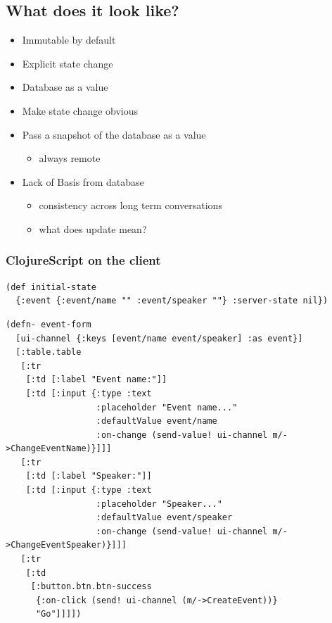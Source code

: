 \documentclass[11pt]{article}
\begin{document}
\subsection*{What does it look like?}
\label{sec:orgheadline22}

\begin{itemize}
\item Immutable by default
\item Explicit state change
\item Database as a value
\end{itemize}

\begin{NOTES}
\begin{itemize}
\item Make state change obvious
\item Pass a snapshot of the database as a value
\begin{itemize}
\item always remote
\end{itemize}
\item Lack of Basis from database
\begin{itemize}
\item consistency across long term conversations
\item what does update mean?
\end{itemize}
\end{itemize}
\end{NOTES}

\subsubsection*{ClojureScript on the client}
\label{sec:orgheadline20}

\begin{verbatim}
(def initial-state
  {:event {:event/name "" :event/speaker ""} :server-state nil})
\end{verbatim}
\begin{verbatim}
(defn- event-form
  [ui-channel {:keys [event/name event/speaker] :as event}]
  [:table.table
   [:tr
    [:td [:label "Event name:"]]
    [:td [:input {:type :text
                  :placeholder "Event name..."
                  :defaultValue event/name
                  :on-change (send-value! ui-channel m/->ChangeEventName)}]]]
   [:tr
    [:td [:label "Speaker:"]]
    [:td [:input {:type :text
                  :placeholder "Speaker..."
                  :defaultValue event/speaker
                  :on-change (send-value! ui-channel m/->ChangeEventSpeaker)}]]]
   [:tr
    [:td
     [:button.btn.btn-success
      {:on-click (send! ui-channel (m/->CreateEvent))}
      "Go"]]]])
\end{verbatim}
\end{document}
